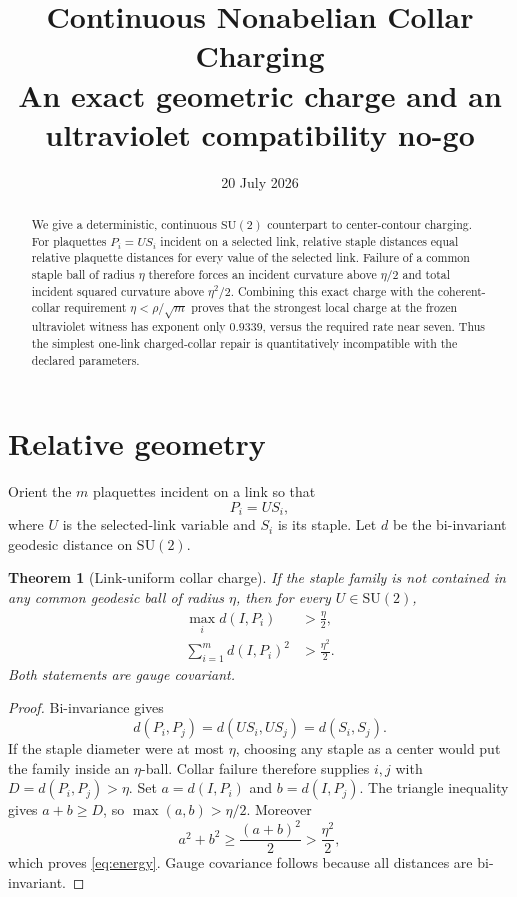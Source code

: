 \documentclass[11pt]{article}
\title{Continuous Nonabelian Collar Charging\\
\large An exact geometric charge and an ultraviolet compatibility no-go}
\author{}
\date{20 July 2026}
\newtheorem{theorem}{Theorem}[section]
\newcommand{\SU}{\mathrm{SU}(2)}
\begin{document}
\maketitle

\begin{abstract}
We give a deterministic, continuous $\SU$ counterpart to center-contour
charging.  For plaquettes $P_i=US_i$ incident on a selected link, relative
staple distances equal relative plaquette distances for every value of the
selected link.  Failure of a common staple ball of radius $\eta$ therefore
forces an incident curvature above $\eta/2$ and total incident squared
curvature above $\eta^2/2$.  Combining this exact charge with the coherent-
collar requirement $\eta<\rho/\sqrt m$ proves that the strongest local charge
at the frozen ultraviolet witness has exponent only $0.9339$, versus the
required rate near seven.  Thus the simplest one-link charged-collar repair is
quantitatively incompatible with the declared parameters.
\end{abstract}

\section{Relative geometry}

Orient the $m$ plaquettes incident on a link so that
\[
 P_i=US_i,
\]
where $U$ is the selected-link variable and $S_i$ is its staple.  Let $d$ be
the bi-invariant geodesic distance on $\SU$.

\begin{theorem}[Link-uniform collar charge]
If the staple family is not contained in any common geodesic ball of radius
$\eta$, then for every $U\in\SU$,
\begin{align}
 \max_i d(I,P_i)&>\frac\eta2,\label{eq:single}\\
 \sum_{i=1}^m d(I,P_i)^2&>\frac{\eta^2}{2}.
 \label{eq:energy}
\end{align}
Both statements are gauge covariant.
\end{theorem}
\begin{proof}
Bi-invariance gives
\[
 d(P_i,P_j)=d(US_i,US_j)=d(S_i,S_j).
\]
If the staple diameter were at most $\eta$, choosing any staple as a center
would put the family inside an $\eta$-ball.  Collar failure therefore supplies
$i,j$ with $D=d(P_i,P_j)>\eta$.  Set
$a=d(I,P_i)$ and $b=d(I,P_j)$.  The triangle inequality gives $a+b\geq D$,
so $\max(a,b)>\eta/2$.  Moreover
\[
 a^2+b^2\geq\frac{(a+b)^2}{2}>\frac{\eta^2}{2},
\]
which proves \eqref{eq:energy}.  Gauge covariance follows because all
distances are bi-invariant.
\end{proof}
\end{document}
